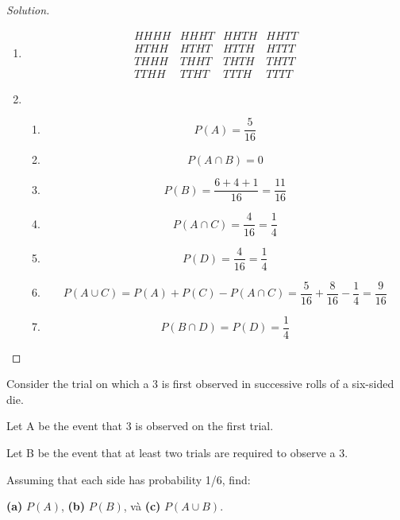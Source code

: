 \documentclass[class=probandstats,crop=false]{standalone}
\begin{document}
\begin{proof}[Solution]
    \begin{enumerate}[label = \textbf{(\alph*)}]
        \item
              \[
                  \begin{matrix}
                      HHHH & HHHT & HHTH & HHTT \\
                      HTHH & HTHT & HTTH & HTTT \\
                      THHH & THHT & THTH & THTT \\
                      TTHH & TTHT & TTTH & TTTT
                  \end{matrix}
              \]
        \item
              \begin{enumerate}[label = \textbf{(\arabic*)}]
                  \item
                        \[ P(A) = \dfrac{5}{16} \]
                  \item
                        \[ P(A\cap B) = 0 \]
                  \item
                        \[ P(B) = \dfrac{6 + 4 + 1}{16} = \dfrac{11}{16} \]
                  \item
                        \[ P(A\cap C) = \dfrac{4}{16} = \dfrac{1}{4} \]
                  \item
                        \[ P(D) = \dfrac{4}{16} = \dfrac{1}{4} \]
                  \item
                        \[ P(A\cup C) = P(A) + P(C) - P(A\cap C) = \dfrac{5}{16} + \dfrac{8}{16} - \dfrac{1}{4} = \dfrac{9}{16} \]
                  \item
                        \[ P(B\cap D) = P(D) = \dfrac{1}{4} \]
              \end{enumerate}
    \end{enumerate}
\end{proof}

\begin{exercise}
    \par Consider the trial on which a 3 is first observed in successive rolls of a six-sided die.
    \par Let A be the event that 3 is observed on the first trial.
    \par Let B be the event that at least two trials are required to observe a 3.
    \par Assuming that each side has probability 1/6, find:
    \par \textbf{(a)} $P(A)$, \textbf{(b)} $P(B)$, và \textbf{(c)} $P(A\cup B)$.
\end{exercise}
\end{document}
